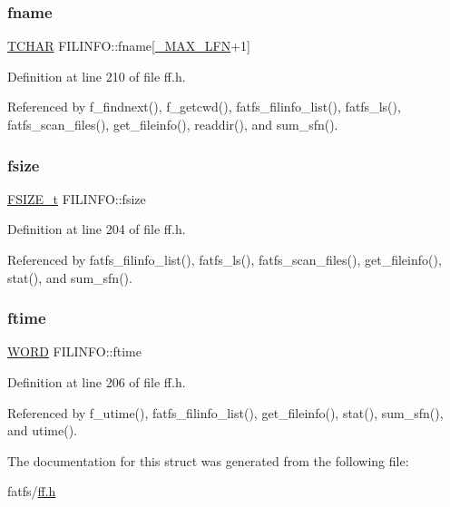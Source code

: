 \subsubsection{\texorpdfstring{fname}{fname}}
{\footnotesize\ttfamily \hyperlink{ff_8h_a03bdb8ce5895c7e261aadc2529637546}{T\+C\+H\+AR} F\+I\+L\+I\+N\+F\+O\+::fname\mbox{[}\hyperlink{ffconf_8h_a14e73a5c703a586c614b3e40b849f82c}{\+\_\+\+M\+A\+X\+\_\+\+L\+FN}+1\mbox{]}}



Definition at line 210 of file ff.\+h.



Referenced by f\+\_\+findnext(), f\+\_\+getcwd(), fatfs\+\_\+filinfo\+\_\+list(), fatfs\+\_\+ls(), fatfs\+\_\+scan\+\_\+files(), get\+\_\+fileinfo(), readdir(), and sum\+\_\+sfn().

\mbox{\label{structFILINFO_a9e5b78ed7190f73de3ebcbdfbd6d1844}} 
\subsubsection{\texorpdfstring{fsize}{fsize}}
{\footnotesize\ttfamily \hyperlink{ff_8h_a3fc0992ad7436250b6b1a0592214b7f2}{F\+S\+I\+Z\+E\+\_\+t} F\+I\+L\+I\+N\+F\+O\+::fsize}



Definition at line 204 of file ff.\+h.



Referenced by fatfs\+\_\+filinfo\+\_\+list(), fatfs\+\_\+ls(), fatfs\+\_\+scan\+\_\+files(), get\+\_\+fileinfo(), stat(), and sum\+\_\+sfn().

\mbox{\label{structFILINFO_ae0f751b79621bf7b29669f177bbe6b9a}} 
\subsubsection{\texorpdfstring{ftime}{ftime}}
{\footnotesize\ttfamily \hyperlink{integer_8h_a197942eefa7db30960ae396d68339b97}{W\+O\+RD} F\+I\+L\+I\+N\+F\+O\+::ftime}



Definition at line 206 of file ff.\+h.



Referenced by f\+\_\+utime(), fatfs\+\_\+filinfo\+\_\+list(), get\+\_\+fileinfo(), stat(), sum\+\_\+sfn(), and utime().



The documentation for this struct was generated from the following file\+:\begin{DoxyCompactItemize}
\item 
fatfs/\hyperlink{ff_8h}{ff.\+h}\end{DoxyCompactItemize}
